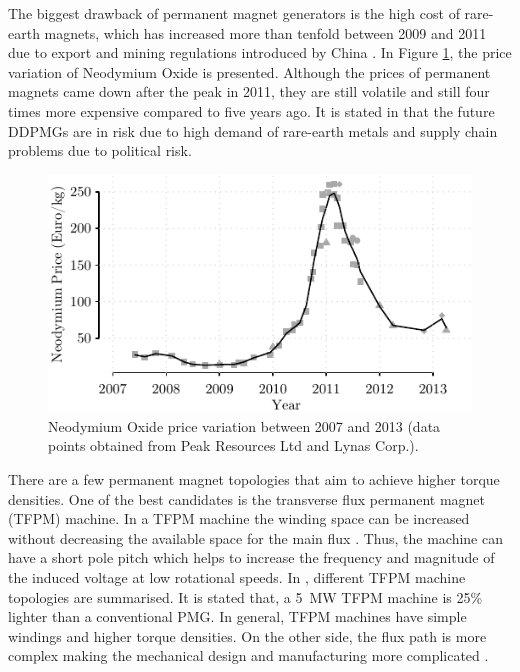 \documentclass[a4paper, 11pt]{article} %
\begin{document}
The biggest drawback of permanent magnet generators is the high cost of rare-earth magnets, which has increased more than tenfold between 2009 and 2011 due to export and mining regulations introduced by China  \cite{rareearthelements}. In Figure \ref{neodymium_price}, the price variation of Neodymium Oxide is presented. Although the prices of permanent magnets came down after the peak in 2011, they are still volatile and still four times more expensive compared to five years ago. It is stated in \cite{Moss2011} that the future DDPMGs are in risk due to high demand of rare-earth metals  and supply chain problems due to political risk.  

\begin{figure}[]
\centering
\includegraphics[]{neodymium_price}
\caption{Neodymium Oxide price variation between 2007 and 2013 (data points obtained from Peak Resources Ltd and Lynas Corp.).}
\label{neodymium_price}
\end{figure}

There are a few permanent magnet topologies that aim to achieve higher torque densities. One of the best candidates is the transverse flux permanent magnet (TFPM) machine. In a TFPM machine the winding space can be increased without decreasing the available space for the main flux \cite{Bang2010}. Thus, the machine can have a short pole pitch which helps to increase the frequency and magnitude of the induced voltage at low rotational speeds. In \cite{Bang2010}, different TFPM machine topologies are summarised. It is stated that, a 5~MW TFPM machine is  25\% lighter than a conventional PMG. In general, TFPM machines have simple windings and higher torque densities. On the other side, the flux path is more complex making the mechanical design and manufacturing more complicated \cite{Bang2008,Bang2009}.
\end{document}
